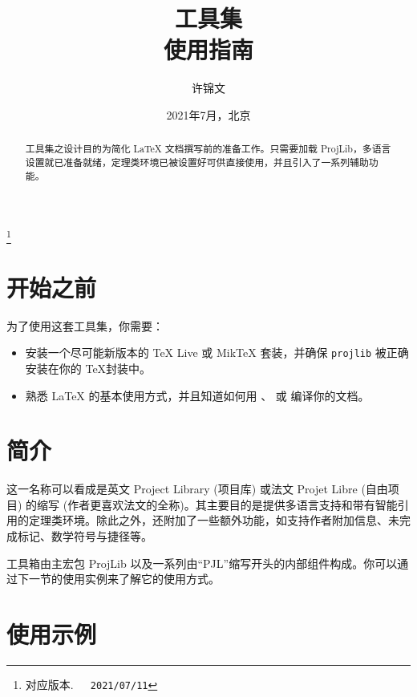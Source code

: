 \documentclass[English,Chinese,French,allowbf,puretext]{lebhart}
\providecommand{\ProjLibPackage}{\mbox{\textsf{ProjLib}}}
\begin{document}
\title{\ProjLib{} 工具集\\[.3\baselineskip]\normalsize 使用指南}
\author{许锦文}
\thanks{对应版本.~~\texttt{\ProjLib{}~2021/07/11}}
\date{2021年7月，北京}

\maketitle

\begin{abstract}
    \ProjLib{} 工具集之设计目的为简化 \LaTeX{} 文档撰写前的准备工作。只需要加载 \ProjLibPackage{}，多语言设置就已准备就绪，定理类环境已被设置好可供直接使用，并且引入了一系列辅助功能。
\end{abstract}

\begin{multicols}{2}
    \small
    \tableofcontents
\end{multicols}

\medskip

\section*{开始之前}

为了使用这套工具集，你需要：
\begin{itemize}
    \item 安装一个尽可能新版本的 TeX Live 或 MikTeX 套装，并确保 \texttt{projlib} 被正确安装在你的 \TeX 封装中。
    \item 熟悉 \LaTeX{} 的基本使用方式，并且知道如何用 、 或  编译你的文档。
\end{itemize}

\section{简介}

\ProjLib{} 这一名称可以看成是英文 Project Library (项目库) 或法文 Projet Libre (自由项目) 的缩写 (作者更喜欢法文的全称)。其主要目的是提供多语言支持和带有智能引用的定理类环境。除此之外，还附加了一些额外功能，如支持作者附加信息、未完成标记、数学符号与捷径等。

\ProjLib{} 工具箱由主宏包 \ProjLibPackage{} 以及一系列由“PJL”缩写开头的内部组件构成。你可以通过下一节的使用实例来了解它的使用方式。

\section{使用示例}
\end{document}
